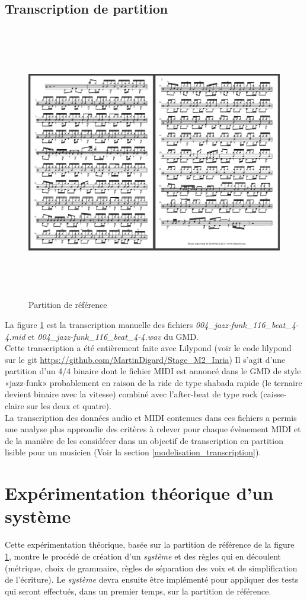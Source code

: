 \subsection*{Transcription de partition}
\begin{figure}[h]
	\includegraphics[height=120mm, width=160mm]{z_images/4_experimentations/1_analyse_midi_audio/3_partition.png}
	\caption{Partition de référence}
	\label{partition_ref}
\end{figure}
La figure \ref{partition_ref} est la transcription manuelle des fichiers \textit{004\_jazz-funk\_116\_beat\_4-4.mid} et \textit{004\_jazz-funk\_116\_beat\_4-4.wav} du GMD.\\Cette transcription a été entièrement faite avec Lilypond (voir le code lilypond sur le git \url{https://github.com/MartinDigard/Stage_M2_Inria})
Il s’agit d’une partition d’un 4/4 binaire dont le fichier MIDI est annoncé dans le GMD de style «jazz-funk» probablement en raison de la ride de type shabada rapide (le ternaire devient binaire avec la vitesse) combiné avec l’after-beat de type rock (caisse-claire sur les deux et quatre).\\
La transcription des données audio et MIDI contenues dans ces fichiers a permis une analyse plus approndie des critères à relever pour chaque évènement MIDI et de la manière de les considérer dans un objectif de transcription en partition lisible pour un musicien (Voir la section \ref{modelisation_transcription}).
\section{Expérimentation théorique d’un système}
Cette expérimentation théorique, basée sur la partition de référence de la figure \ref{partition_ref}, montre le procédé de création d’un \textit{système} et des règles qui en découlent (métrique, choix de grammaire, règles de séparation des voix et de simplification de l’écriture). Le \textit{système} devra ensuite être implémenté pour appliquer des tests qui seront effectués, dans un premier temps, sur la partition de référence.
